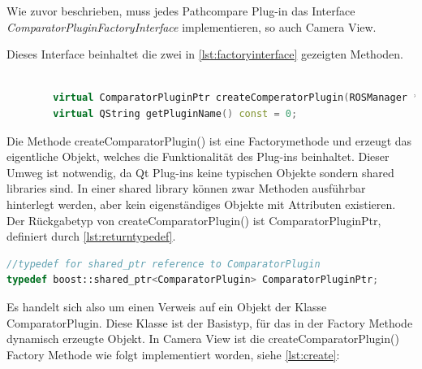 Wie zuvor beschrieben, muss jedes Pathcompare Plug-in das Interface
\textit{ComparatorPluginFactoryInterface} implementieren, so auch Camera View.

Dieses Interface beinhaltet die zwei in \autoref{lst:factoryinterface}
gezeigten Methoden.

\begin{lstlisting}[caption=Interfacemethoden - Plug-ins müssen diese implementieren , language=C++, basicstyle=\footnotesize, label=lst:factoryinterface]

        virtual ComparatorPluginPtr createComperatorPlugin(ROSManager * ros_manager, QWidget *tab_widget) const = 0;
        virtual QString getPluginName() const = 0;

\end{lstlisting}

Die Methode createComparatorPlugin() ist eine Factorymethode und erzeugt das
eigentliche Objekt, welches die Funktionalität des Plug-ins beinhaltet. Dieser
Umweg ist notwendig, da Qt Plug-ins keine typischen Objekte sondern
shared libraries sind. In einer shared library können
zwar Methoden ausführbar hinterlegt werden, aber kein eigenständiges Objekte
mit Attributen existieren. Der Rückgabetyp von createComparatorPlugin() ist
ComparatorPluginPtr, definiert durch \autoref{lst:returntypedef}.

\begin{lstlisting}[caption=Typdefinition von CompoaratorPluginPtr, language=C++, basicstyle=\footnotesize, label=lst:returntypedef]
//typedef for shared_ptr reference to ComparatorPlugin
typedef boost::shared_ptr<ComparatorPlugin> ComparatorPluginPtr;
\end{lstlisting}

Es handelt sich also um einen Verweis auf ein Objekt der Klasse
ComparatorPlugin. Diese Klasse ist der Basistyp, für das in der Factory Methode
dynamisch erzeugte Objekt. In Camera View ist die createComparatorPlugin()
Factory Methode wie folgt implementiert worden, siehe \autoref{lst:create}:


